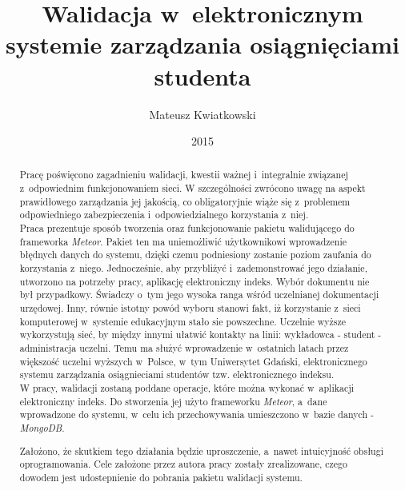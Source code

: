 \documentclass{xmgr}
\author   {Mateusz Kwiatkowski}
\title    {Walidacja w~elektronicznym systemie zarządzania osiągnięciami studenta}
\date     {2015}
\begin{document}
\begin{abstract}



\indent \indent Pracę poświęcono zagadnieniu walidacji, kwestii ważnej i~integralnie związanej z~odpowiednim funkcjonowaniem sieci.
W szczególności zwrócono uwagę na aspekt prawidłowego zarządzania jej jakością, co obligatoryjnie wiąże się z~problemem
odpowiedniego zabezpieczenia i~odpowiedzialnego korzystania z~niej.
\\
\indent Praca prezentuje sposób tworzenia oraz funkcjonowanie pakietu walidującego do frameworka \textit{Meteor}. Pakiet ten
ma uniemożliwić użytkownikowi wprowadzenie błędnych danych do systemu, dzięki czemu podniesiony zostanie poziom zaufania
do korzystania z~niego. Jednocześnie, aby przybliżyć i~zademonstrować jego działanie, utworzono na potrzeby pracy, aplikację elektroniczny indeks.
Wybór dokumentu nie był przypadkowy. Świadczy o~tym jego wysoka ranga wśród uczelnianej dokumentacji urzędowej. Inny, równie istotny powód
wyboru stanowi fakt, iż korzystanie z~sieci komputerowej w~systemie edukacyjnym stało sie powszechne. Uczelnie wyższe wykorzystują sieć, by
między innymi ułatwić kontakty na linii: wykładowca - student - administracja uczelni.  Temu ma służyć wprowadzenie w~ostatnich latach przez
większość uczelni wyższych w~Polsce, w~tym Uniwersytet Gdański, elektronicznego systemu zarządzania osiągnieciami studentów
tzw. elektronicznego indeksu.
\\
\indent W pracy, walidacji zostaną poddane operacje, które można wykonać w~aplikacji elektroniczny indeks. Do stworzenia jej użyto frameworku \textit{Meteor}, a~dane wprowadzone do systemu, w~celu ich przechowywania umieszczono w~bazie danych - \textit{MongoDB}.

\indent Założono, że skutkiem tego działania będzie uproszczenie, a~nawet intuicyjność obsługi oprogramowania. Cele założone przez autora pracy zostały zrealizowane, czego dowodem jest udostepnienie do pobrania pakietu walidacji systemu.

\end{abstract}

\maketitle
%
\introduction
\end{document}
